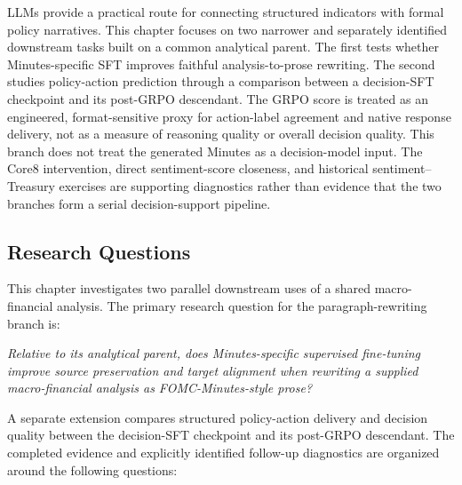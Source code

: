 LLMs provide a practical route for connecting structured indicators with
formal policy narratives. This chapter focuses on two narrower and separately
identified downstream tasks built on a common analytical parent. The first
tests whether Minutes-specific SFT improves faithful analysis-to-prose
rewriting. The second studies policy-action prediction through a comparison
between a decision-SFT checkpoint and its post-GRPO descendant. The GRPO score
is treated as an engineered, format-sensitive proxy for action-label agreement
and native response delivery, not as a measure of reasoning quality or overall
decision quality. This branch does not treat the generated Minutes as a
decision-model input. The Core8 intervention, direct sentiment-score closeness,
and historical sentiment--Treasury exercises are supporting diagnostics rather
than evidence that the two branches form a serial decision-support pipeline.


\subsection*{Research Questions}

This chapter investigates two parallel downstream uses of a shared
macro-financial analysis. The primary research question for the
paragraph-rewriting branch is:

\textit{Relative to its analytical parent, does Minutes-specific supervised
fine-tuning improve source preservation and target alignment when rewriting a
supplied macro-financial analysis as FOMC-Minutes-style prose?}

A separate extension compares structured policy-action delivery and decision
quality between the decision-SFT checkpoint and its post-GRPO descendant. The
completed evidence and explicitly identified follow-up diagnostics are
organized around the following questions:

